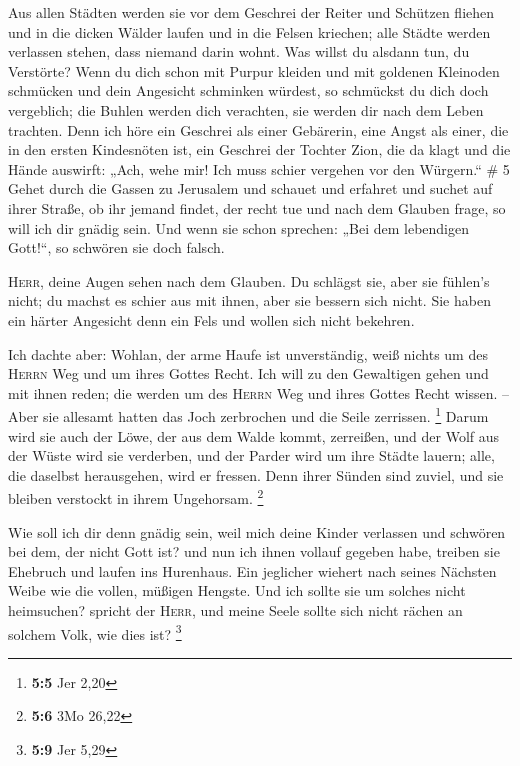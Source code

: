  Aus allen Städten werden sie vor dem Geschrei der Reiter
und Schützen fliehen und in die dicken Wälder laufen und in die Felsen
kriechen; alle Städte werden verlassen stehen, dass niemand darin wohnt.
 Was willst du alsdann tun, du Verstörte? Wenn du dich
schon mit Purpur kleiden und mit goldenen Kleinoden schmücken und dein
Angesicht schminken würdest, so schmückst du dich doch vergeblich; die
Buhlen werden dich verachten, sie werden dir nach dem Leben trachten.
 Denn ich höre ein Geschrei als einer Gebärerin, eine
Angst als einer, die in den ersten Kindesnöten ist, ein Geschrei der
Tochter Zion, die da klagt und die Hände auswirft: „Ach, wehe mir! Ich
muss schier vergehen vor den Würgern.`` \# 5  Gehet durch
die Gassen zu Jerusalem und schauet und erfahret und suchet auf ihrer
Straße, ob ihr jemand findet, der recht tue und nach dem Glauben frage,
so will ich dir gnädig sein.  Und wenn sie schon sprechen:
„Bei dem lebendigen Gott!{}``, so schwören sie doch falsch.

 \textsc{Herr}, deine Augen sehen nach dem Glauben. Du
schlägst sie, aber sie fühlen's nicht; du machst es schier aus mit
ihnen, aber sie bessern sich nicht. Sie haben ein härter Angesicht denn
ein Fels und wollen sich nicht bekehren.

 Ich dachte aber: Wohlan, der arme Haufe ist unverständig,
weiß nichts um des \textsc{Herrn} Weg und um ihres Gottes Recht.
 Ich will zu den Gewaltigen gehen und mit ihnen reden; die
werden um des \textsc{Herrn} Weg und ihres Gottes Recht wissen. -- Aber
sie allesamt hatten das Joch zerbrochen und die Seile zerrissen.
\footnote{\textbf{5:5} Jer 2,20}  Darum wird sie auch der
Löwe, der aus dem Walde kommt, zerreißen, und der Wolf aus der Wüste
wird sie verderben, und der Parder wird um ihre Städte lauern; alle, die
daselbst herausgehen, wird er fressen. Denn ihrer Sünden sind zuviel,
und sie bleiben verstockt in ihrem Ungehorsam. \footnote{\textbf{5:6}
  3Mo 26,22}

 Wie soll ich dir denn gnädig sein, weil mich deine Kinder
verlassen und schwören bei dem, der nicht Gott ist? und nun ich ihnen
vollauf gegeben habe, treiben sie Ehebruch und laufen ins Hurenhaus.
 Ein jeglicher wiehert nach seines Nächsten Weibe wie die
vollen, müßigen Hengste.  Und ich sollte sie um solches
nicht heimsuchen? spricht der \textsc{Herr}, und meine Seele sollte sich
nicht rächen an solchem Volk, wie dies ist? \footnote{\textbf{5:9} Jer
  5,29}

